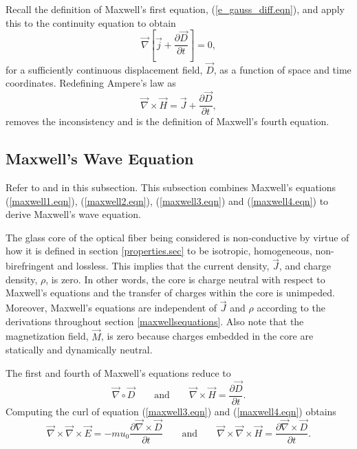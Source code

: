 \documentclass[12pt]{article}
\theoremstyle{definition}
\numberwithin{equation}{section}
\begin{document}
Recall the definition of Maxwell's first equation, (\ref{e_gauss_diff.eqn}), and apply this to the continuity equation to obtain
\begin{equation}
\vec{\nabla}\left[\vec{j}+\frac{\partial\vec{D}}{\partial t}\right]=0,
\end{equation}
for a sufficiently continuous displacement field, $\vec{D}$, as a function of space and time coordinates. Redefining Ampere's law as
\begin{equation}\vec{\nabla}\times\vec{H}=\vec{J}+\frac{\partial\vec{D}}{\partial t},
\label{maxwell4.eqn}
\end{equation}
removes the inconsistency and is the definition of Maxwell's fourth equation.
\subsection{Maxwell's Wave Equation}\label{maxwell_wave.sec}
Refer to \cite{Reitz} and \cite{Belanger} in this subsection. This subsection combines Maxwell's equations (\ref{maxwell1.eqn}), (\ref{maxwell2.eqn}), (\ref{maxwell3.eqn}) and (\ref{maxwell4.eqn}) to derive Maxwell's wave equation. 

The glass core of the optical fiber being considered is non-conductive by virtue of how it is defined in section \ref{properties.sec} to be isotropic, homogeneous, non-birefringent and lossless. This implies that the current density, $\vec{J}$, and charge density, $\rho$, is zero. In other words, the core is charge neutral with respect to Maxwell's equations and the transfer of charges within the core is unimpeded. Moreover, Maxwell's equations are independent of $\vec{J}$ and $\rho$ according to the derivations throughout section \ref{maxwellsequations}. Also note that the magnetization field, $\vec{M}$, is zero because charges embedded in the core are statically and dynamically neutral.

The first and fourth of Maxwell's equations reduce to
$$\vec{\nabla}\circ\vec{D}\qquad\mbox{and}\qquad\vec{\nabla}\times\vec{H}=\frac{\partial\vec{D}}{\partial t}.$$ Computing the curl of equation (\ref{maxwell3.eqn}) and (\ref{maxwell4.eqn}) obtains
\begin{equation}
\vec{\nabla}\times\vec{\nabla}\times\vec{E}=-mu_0\frac{\partial\vec{\nabla}\times\vec{D}}{\partial t}\qquad\mbox{and}\qquad\vec{\nabla}\times\vec{\nabla}\times\vec{H}=\frac{\partial\vec{\nabla}\times\vec{D}}{\partial t}.
\label{maxwell_wave1.eqn}
\end{equation}
\end{document}
